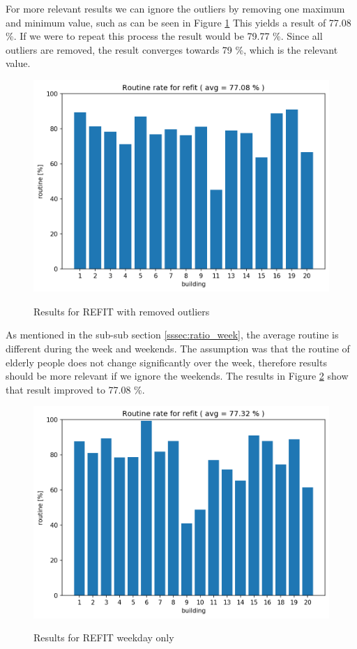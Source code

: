 For more relevant results we can ignore the outliers by removing one maximum and minimum value, such as can be seen in Figure \ref{fig:refit_res2}
This yields a result of 77.08 \%.
If we were to repeat this process the result would be 79.77 \%.
Since all outliers are removed, the result converges towards 79 \%, which is the relevant value. 

\begin{figure}[H]
	\centering
	\caption{Results for REFIT with removed outliers}
	\includegraphics[width=.8\textwidth]{Figures/EC/refit_res2.png}
	\label{fig:refit_res2}
\end{figure}


As mentioned in the sub-sub section \ref{sssec:ratio_week}, the average routine is different during the week and weekends.
The assumption was that the routine of elderly people does not change significantly over the week, therefore results should be more relevant if we ignore the weekends.
The results in Figure \ref{fig:refit_res_nw_1"} show that result improved to 77.08 \%.

\begin{figure}[H]
	\centering
	\caption{Results for REFIT weekday only}
	\includegraphics[width=.8\textwidth]{Figures/EC/refit_res_nw_1.png}
	\label{fig:refit_res_nw_1"}
\end{figure}


